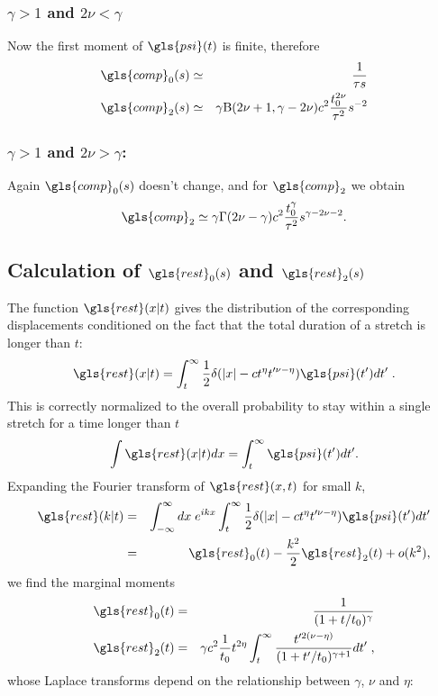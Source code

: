 \subsubsection{$\gamma>1$ and  $2\nu<\gamma$}
Now the first moment of $\gls{psi}(t)$ is finite, therefore 
\begin{eqnarray}
 \gls{comp}_0(s) &\simeq &  \frac{1}{\tau s}  \\
 \gls{comp}_2(s) &\simeq & \gamma \mathrm{B}(2\nu+1,\gamma-2\nu) c^2 \frac{t_0^{2\nu}}{\tau^2}  s^{-2}
\end{eqnarray}


\subsubsection{$\gamma>1$ and $2\nu>\gamma$: }
Again $\gls{comp}_0(s)$ doesn't change, and for $\gls{comp}_2$ we obtain
\begin{equation}
\gls{comp}_2 \simeq  \gamma \Gamma(2\nu-\gamma)  c^2 \frac{t_0^\gamma}{\tau^2}   s^{\gamma-2\nu -2} .
\end{equation}

\subsection{Calculation of  $\gls{rest}_0(s)$ and $\gls{rest}_2(s)$}
The function $\gls{rest}(x|t)$ gives the distribution of
the corresponding displacements conditioned on the fact that the total duration of a stretch is longer than $t$:
\begin{equation}
 \gls{rest}(x|t) =  \int_t^\infty \frac{1}{2} \delta(|x| - c t^{\eta}t'^{\nu-\eta}) \gls{psi}(t') dt' \; .
\end{equation}
This is correctly normalized to the overall probability to stay within a single stretch for a time longer than $t$ 
\begin{equation}
 \int \gls{rest}(x|t)  dx = \int_t^\infty \gls{psi}(t') dt'.
\end{equation}
Expanding the Fourier transform of $\gls{rest}(x,t)$ for small $k$,
\begin{eqnarray}
\gls{rest}(k|t) &=& \int_{-\infty}^{\infty} dx \; e^{ikx} \int_t^\infty \frac{1}{2} \delta(|x| - c t^{\eta}t'^{\nu-\eta}) \gls{psi}(t') dt' \nonumber \\
&=& \gls{rest}_0(t) - \frac{k^2}{2} \gls{rest}_2(t) + o(k^2), 
\end{eqnarray}
we find the marginal moments
\begin{eqnarray}
\gls{rest}_0(t) &=& \frac{1}{(1+t/t_0)^{\gamma}} \\
\gls{rest}_2(t) &=& \gamma c^2 \frac{1 }{t_0} t^{2\eta} \int_t^\infty \frac{t'^{2(\nu-\eta)}}{(1+t'/t_0)^{\gamma+1}} dt' \; , 
\end{eqnarray}
whose Laplace transforms depend on the relationship between $\gamma$, $\nu$ and $\eta$: 


